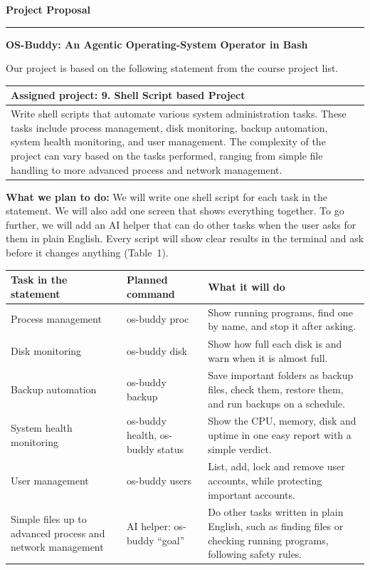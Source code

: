 \documentclass[11pt,a4paper]{article}
\newcommand{\hdrrow}{\rowcolor{hdrgrey}}
\newcommand{\sect}[1]{\par\vspace{0.5em}{\large\bfseries #1}\par\vspace{0.1em}}
\begin{document}
{\LARGE\bfseries Project Proposal}\\[-0.2em]
\rule{\linewidth}{0.5pt}

\sect{Title}
\textbf{OS-Buddy: An Agentic Operating-System Operator in Bash}

\sect{Project Statement}
Our project is based on the following statement from the course project list.

\begingroup\small
\begin{tabularx}{\linewidth}{|Y|}
\hline
\hdrrow \textbf{Assigned project: 9. Shell Script based Project} \\ \hline
Write shell scripts that automate various system administration tasks. These tasks include process management, disk monitoring, backup automation, system health monitoring, and user management. The complexity of the project can vary based on the tasks performed, ranging from simple file handling to more advanced process and network management. \\ \hline
\end{tabularx}
\endgroup

\textbf{What we plan to do:} We will write one shell script for each task in the statement. We will also add one screen that shows everything together. To go further, we will add an AI helper that can do other tasks when the user asks for them in plain English. Every script will show clear results in the terminal and ask before it changes anything (Table~1).

\begin{center}
\begingroup\small
\begin{tabularx}{\linewidth}{|P{2.6cm}|P{3.1cm}|Y|}
\hline
\hdrrow \textbf{Task in the statement} & \textbf{Planned command} & \textbf{What it will do} \\ \hline
Process management & os-buddy proc & Show running programs, find one by name, and stop it after asking. \\ \hline
Disk monitoring & os-buddy disk & Show how full each disk is and warn when it is almost full. \\ \hline
Backup automation & os-buddy backup & Save important folders as backup files, check them, restore them, and run backups on a schedule. \\ \hline
System health monitoring & os-buddy health, os-buddy status & Show the CPU, memory, disk and uptime in one easy report with a simple verdict. \\ \hline
User management & os-buddy users & List, add, lock and remove user accounts, while protecting important accounts. \\ \hline
Simple files up to advanced process and network management & AI helper: os-buddy “goal” & Do other tasks written in plain English, such as finding files or checking running programs, following safety rules. \\ \hline
\end{tabularx}
\endgroup
\end{center}
\end{document}
